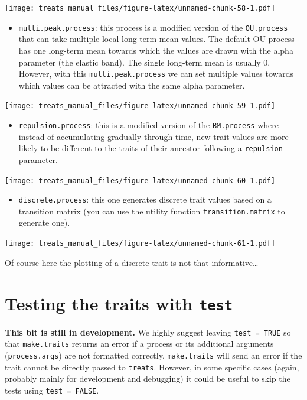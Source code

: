 \documentclass[
]{book}
\providecommand{\tightlist}{%
  \setlength{\itemsep}{0pt}\setlength{\parskip}{0pt}}
\begin{document}
\texttt{[image: treats\_manual\_files/figure-latex/unnamed-chunk-58-1.pdf]}

\begin{itemize}
\tightlist
\item
  \texttt{multi.peak.process}: this process is a modified version of the \texttt{OU.process} that can take multiple local long-term mean values. The default OU process has one long-term mean towards which the values are drawn with the alpha parameter (the elastic band). The single long-term mean is usually 0. However, with this \texttt{multi.peak.process} we can set multiple values towards which values can be attracted with the same alpha parameter.
\end{itemize}

\texttt{[image: treats\_manual\_files/figure-latex/unnamed-chunk-59-1.pdf]}

\begin{itemize}
\tightlist
\item
  \texttt{repulsion.process}: this is a modified version of the \texttt{BM.process} where instead of accumulating gradually through time, new trait values are more likely to be different to the traits of their ancestor following a \texttt{repulsion} parameter.
\end{itemize}

\texttt{[image: treats\_manual\_files/figure-latex/unnamed-chunk-60-1.pdf]}

\begin{itemize}
\tightlist
\item
  \texttt{discrete.process}: this one generates discrete trait values based on a transition matrix (you can use the utility function \texttt{transition.matrix} to generate one).
\end{itemize}

\texttt{[image: treats\_manual\_files/figure-latex/unnamed-chunk-61-1.pdf]}

Of course here the plotting of a discrete trait is not that informative\ldots{}

\hypertarget{testing-the-traits-with-test}{%
\section{\texorpdfstring{Testing the traits with \texttt{test}}{Testing the traits with test}}\label{testing-the-traits-with-test}}

\textbf{This bit is still in development.}
We highly suggest leaving \texttt{test\ =\ TRUE} so that \texttt{make.traits} returns an error if a process or its additional arguments (\texttt{process.args}) are not formatted correctly.
\texttt{make.traits} will send an error if the trait cannot be directly passed to \texttt{treats}.
However, in some specific cases (again, probably mainly for development and debugging) it could be useful to skip the tests using \texttt{test\ =\ FALSE}.
\end{document}
